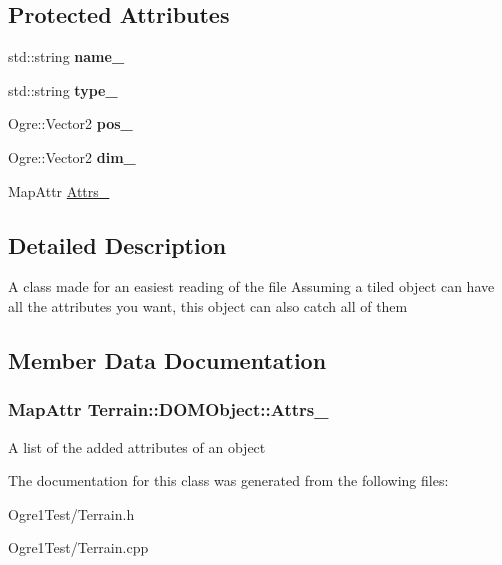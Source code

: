 \subsection*{Protected Attributes}
\begin{DoxyCompactItemize}
\item 
std\+::string {\bfseries name\+\_\+}\hypertarget{class_terrain_1_1_d_o_m_object_ad84ce98051c83f6789fd7ca25314d926}{}\label{class_terrain_1_1_d_o_m_object_ad84ce98051c83f6789fd7ca25314d926}

\item 
std\+::string {\bfseries type\+\_\+}\hypertarget{class_terrain_1_1_d_o_m_object_a6cbe8721c2f1907df396372c436a0711}{}\label{class_terrain_1_1_d_o_m_object_a6cbe8721c2f1907df396372c436a0711}

\item 
Ogre\+::\+Vector2 {\bfseries pos\+\_\+}\hypertarget{class_terrain_1_1_d_o_m_object_afbf61d774e52524a2180de7707d2392f}{}\label{class_terrain_1_1_d_o_m_object_afbf61d774e52524a2180de7707d2392f}

\item 
Ogre\+::\+Vector2 {\bfseries dim\+\_\+}\hypertarget{class_terrain_1_1_d_o_m_object_a4b81dd71bcc1a7017a79b96a99cc78a4}{}\label{class_terrain_1_1_d_o_m_object_a4b81dd71bcc1a7017a79b96a99cc78a4}

\item 
Map\+Attr \hyperlink{class_terrain_1_1_d_o_m_object_a378c8749b1e77f8093d0e1e67f8a6629}{Attrs\+\_\+}
\end{DoxyCompactItemize}


\subsection{Detailed Description}
A class made for an easiest reading of the file Assuming a tiled object can have all the attributes you want, this object can also catch all of them 

\subsection{Member Data Documentation}
\subsubsection[{\texorpdfstring{Attrs\+\_\+}{Attrs_}}]{\setlength{\rightskip}{0pt plus 5cm}Map\+Attr Terrain\+::\+D\+O\+M\+Object\+::\+Attrs\+\_\+\hspace{0.3cm}{\ttfamily [protected]}}\hypertarget{class_terrain_1_1_d_o_m_object_a378c8749b1e77f8093d0e1e67f8a6629}{}\label{class_terrain_1_1_d_o_m_object_a378c8749b1e77f8093d0e1e67f8a6629}
A list of the added attributes of an object 

The documentation for this class was generated from the following files\+:\begin{DoxyCompactItemize}
\item 
Ogre1\+Test/Terrain.\+h\item 
Ogre1\+Test/Terrain.\+cpp\end{DoxyCompactItemize}
